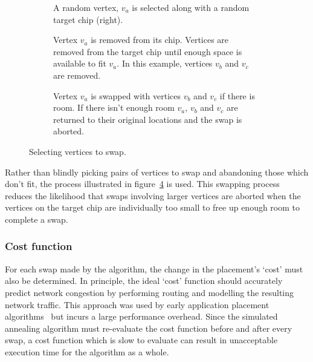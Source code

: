 				\begin{figure}
					\center
					\begin{subfigure}{\linewidth}
						\center
						\caption{A random vertex, $v_a$ is selected along with a random
						target chip (right).}
						\label{fig:sa-swap-select}
					\end{subfigure}
					
					\vspace*{1em}
					
					\begin{subfigure}{\linewidth}
						\center
						\caption{Vertex $v_a$ is removed from its chip. Vertices are removed
						from the target chip until enough space is available to fit $v_a$.
						In this example, vertices $v_b$ and $v_c$ are removed.}
						\label{fig:sa-swap-remove}
					\end{subfigure}
					
					\vspace*{1em}
					
					\begin{subfigure}{\linewidth}
						\center
						\caption{Vertex $v_a$ is swapped with vertices $v_b$ and $v_c$ if
						there is room. If there isn't enough room $v_a$, $v_b$ and $v_c$
						are returned to their original locations and the swap is aborted.}
						\label{fig:sa-swap-commit}
					\end{subfigure}
					
					\caption{Selecting vertices to swap.}
					\label{fig:sa-swap}
				\end{figure}
				
				Rather than blindly picking pairs of vertices to swap and abandoning
				those which don't fit, the process illustrated in
				figure~\ref{fig:sa-swap} is used. This swapping process reduces the
				likelihood that swaps involving larger vertices are aborted when the
				vertices on the target chip are individually too small to free up
				enough room to complete a swap.
			
			\subsubsection{Cost function}
				
				For each swap made by the algorithm, the change in the placement's
				`cost' must also be determined. In principle, the ideal `cost' function
				should accurately predict network congestion by performing routing and
				modelling the resulting network traffic. This approach was used by
				early application placement algorithms~\cite{steele85} but incurs a
				large performance overhead. Since the simulated annealing algorithm
				must re-evaluate the cost function before and after every swap, a cost
				function which is slow to evaluate can result in unacceptable execution
				time for the algorithm as a whole.
				
